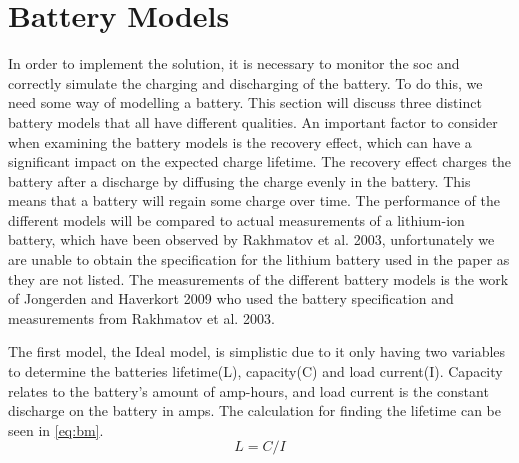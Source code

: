 \section{Battery Models} \label{sec:kibam}
In order to implement the solution, it is necessary to monitor the \gls{soc} and correctly simulate the charging and discharging of the battery. To do this, we need some way of modelling a battery. 
This section will discuss three distinct battery models that all have different qualities. 
An important factor to consider when examining the battery models is the recovery effect, which can have a significant impact on the expected charge lifetime\cite{battery_model}.
The recovery effect charges the battery after a discharge by diffusing the charge evenly in the battery. This means that a battery will regain some charge over time.
The performance of the different models will be compared to actual measurements of a lithium-ion battery, which have been observed by Rakhmatov et al. 2003\cite{battery_lifetime_analysis}, unfortunately we are unable to obtain the specification for the lithium battery used in the paper as they are not listed.
The measurements of the different battery models is the work of Jongerden and Haverkort 2009\cite{battery_model} who used the battery specification and measurements from Rakhmatov et al. 2003\cite{battery_lifetime_analysis}.

The first model, the Ideal model, is simplistic due to it only having two variables to determine the batteries lifetime(L), capacity(C) and load current(I). 
Capacity relates to the battery's amount of amp-hours, and load current is the constant discharge on the battery in amps. 
The calculation for finding the lifetime can be seen in \cref{eq:bm}.
\begin{equation}\label{eq:bm}
L=C/I
\end{equation}

